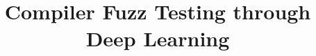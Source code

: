 



\title{Compiler Fuzz Testing through Deep Learning}
\maketitle













\printbibliography

